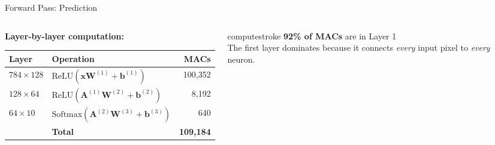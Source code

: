 \documentclass[aspectratio=169, 12pt]{beamer}
\begin{document}
\begin{frame}{Forward Pass: Prediction}

\small
\begin{columns}[T]
  \begin{column}{0.55\textwidth}
    \textbf{Layer-by-layer computation:}

    \vspace{0.1cm}
    {\scriptsize
    \renewcommand{\arraystretch}{1.1}
    \begin{tabular}{@{}llr@{}}
      \toprule
      \textbf{Layer} & \textbf{Operation} & \textbf{MACs} \\
      \midrule
      $784\!\times\!128$ & $\text{ReLU}(\mathbf{x}\mathbf{W}^{(1)}\!+\!\mathbf{b}^{(1)})$ & 100,352 \\
      $128\!\times\!64$  & $\text{ReLU}(\mathbf{A}^{(1)}\mathbf{W}^{(2)}\!+\!\mathbf{b}^{(2)})$ & 8,192 \\
      $64\!\times\!10$   & $\text{Softmax}(\mathbf{A}^{(2)}\mathbf{W}^{(3)}\!+\!\mathbf{b}^{(3)})$ & 640 \\
      \midrule
      & \textbf{Total} & \textbf{109,184} \\
      \bottomrule
    \end{tabular}
    }
  \end{column}
  \begin{column}{0.42\textwidth}
    \vspace{0.2cm}
    \begin{mlsyscard}{computestroke}
    \textbf{92\% of MACs} are in Layer 1\\[0.1cm]
    {\footnotesize The first layer dominates because it connects \emph{every} input pixel to \emph{every} neuron.}
    \end{mlsyscard}

    \vspace{0.15cm}
  \end{column}
\end{columns}

\end{frame}
\end{document}
